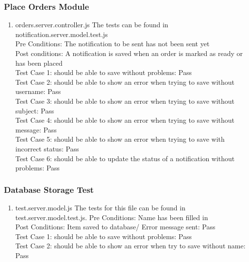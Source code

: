 \documentclass[a4paper,12pt]{report}
\begin{document}
  \subsubsection{Place Orders Module}
 \begin{enumerate}
\item orders.server.controller.js
The tests can be found in notification.server.model.test.js\\
Pre Conditions: The notification to be sent has not been sent yet\\
Post conditions: A notification is saved when an order is marked as ready or has been placed \\
Test Case 1: should be able to save without problems: Pass\\
Test Case 2: should be able to show an error when trying to save without username: Pass\\
Test Case 3: should be able to show an error when trying to save without subject: Pass\\
Test Case 4: should be able to show an error when trying to save without message: Pass \\
Test Case 5: should be able to show an error when trying to save with incorrect status: Pass \\
Test Case 6: should be able to update the status of a notification without problems: Pass \\
 \end{enumerate}

\subsubsection{Database Storage Test }
 \begin{enumerate}
\item test.server.model.js
The tests for this file can be found in test.server.model.test.js.
Pre Conditions: Name has been filled in\\
Post Conditions: Item saved to database/ Error message sent: Pass \\
Test Case 1: should be able to save without problems: Pass\\
Test Case 2:  should be able to show an error when try to save without name: Pass\\
\end{enumerate}
\end{document}
